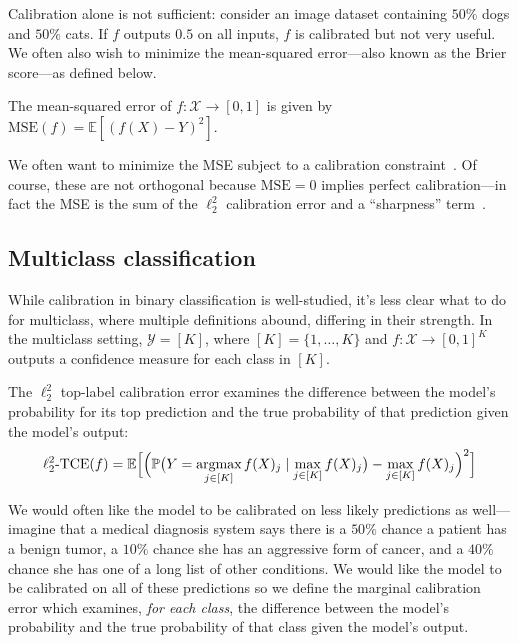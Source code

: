 Calibration alone is not sufficient: consider an image dataset containing $50\%$ dogs and $50\%$ cats.
If $f$ outputs $0.5$ on all inputs, $f$ is calibrated but not very useful.
We often also wish to minimize the mean-squared error---also known as the Brier score---as defined below.

\begin{definition}
The mean-squared error of $f : \mathcal{X} \to [0, 1]$ is given by $\mbox{MSE}(f) = \mathbb{E}[(f(X) - Y)^2]$.
\end{definition}

We often want to minimize the MSE subject to a calibration constraint~\cite{gneiting2005weather, gneiting2007probabilistic}. Of course, these are not orthogonal because $\mbox{MSE} = 0$ implies perfect calibration---in fact the MSE is the sum of the $\ell_2^2$ calibration error and a ``sharpness'' term~\cite{murphy1973vector,degroot1983forecasters, kuleshov2015calibrated}.

\subsection{Multiclass classification}

While calibration in binary classification is well-studied,
it's less clear what to do for multiclass, where multiple definitions abound, differing in their strength. In the multiclass setting, $\mathcal{Y} = [K]$, where $[K] = \{1, \dots, K\}$ and $f : \mathcal{X} \to [0, 1]^K$ outputs a confidence measure for each class in $[K]$.

\begin{definition}
The $\ell_2^2$ top-label calibration error examines the difference between the model's probability for its top prediction and the true probability of that prediction given the model's output:
\begin{align}
\ell_2^2\mbox{-TCE}(f) = \mathbb{E}\Big[ \Big( \mathbb{P}\big(Y = \mathop{\mbox{argmax}}_{j \in [K]} f(X)_j \mid \max_{j \in [K]} f(X)_j\big) - \max_{j \in [K]} f(X)_j \Big)^2 \Big]
\end{align}
\end{definition}

We would often like the model to be calibrated on less likely predictions as well---imagine that a medical diagnosis system says there is a $50\%$ chance a patient has a benign tumor, a $10\%$ chance she has an aggressive form of cancer, and a $40\%$ chance she has one of a long list of other conditions. We would like the model to be calibrated on all of these predictions so we define the marginal calibration error which examines, \emph{for each class}, the difference between the model's probability and the true probability of that class given the model's output.

